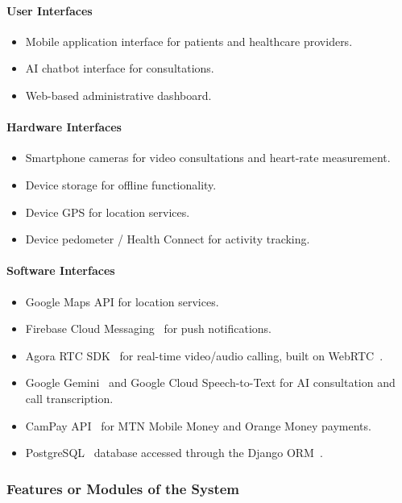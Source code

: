\paragraph{User Interfaces}
\begin{itemize}
  \item Mobile application interface for patients and healthcare providers.
  \item AI chatbot interface for consultations.
  \item Web-based administrative dashboard.
\end{itemize}

\paragraph{Hardware Interfaces}
\begin{itemize}
  \item Smartphone cameras for video consultations and heart-rate measurement.
  \item Device storage for offline functionality.
  \item Device GPS for location services.
  \item Device pedometer / Health Connect for activity tracking.
\end{itemize}

\paragraph{Software Interfaces}
\begin{itemize}
  \item Google Maps API for location services.
  \item Firebase Cloud Messaging~\cite{firebase_docs} for push notifications.
  \item Agora RTC SDK~\cite{agora_docs} for real-time video/audio calling, built on WebRTC~\cite{webrtc_w3c}.
  \item Google Gemini~\cite{gemini_docs} and Google Cloud Speech-to-Text for AI consultation and call transcription.
  \item CamPay API~\cite{campay_docs} for MTN Mobile Money and Orange Money payments.
  \item PostgreSQL~\cite{postgres_docs} database accessed through the Django ORM~\cite{django_docs}.
\end{itemize}

\subsubsection*{Features or Modules of the System}

